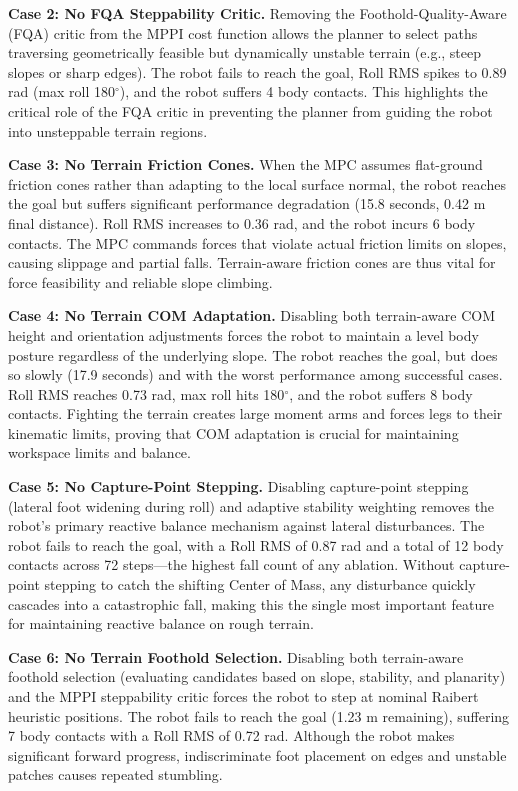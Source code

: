 \documentclass[letterpaper, 10 pt, conference]{ieeeconf}  %
\begin{document}
\textbf{Case 2: No FQA Steppability Critic.} Removing the Foothold-Quality-Aware (FQA) critic from the MPPI cost function allows the planner to select paths traversing geometrically feasible but dynamically unstable terrain (e.g., steep slopes or sharp edges). The robot fails to reach the goal, Roll RMS spikes to 0.89 rad (max roll 180$^\circ$), and the robot suffers 4 body contacts. This highlights the critical role of the FQA critic in preventing the planner from guiding the robot into unsteppable terrain regions.

\textbf{Case 3: No Terrain Friction Cones.} When the MPC assumes flat-ground friction cones rather than adapting to the local surface normal, the robot reaches the goal but suffers significant performance degradation (15.8 seconds, 0.42 m final distance). Roll RMS increases to 0.36 rad, and the robot incurs 6 body contacts. The MPC commands forces that violate actual friction limits on slopes, causing slippage and partial falls. Terrain-aware friction cones are thus vital for force feasibility and reliable slope climbing.

\textbf{Case 4: No Terrain COM Adaptation.} Disabling both terrain-aware COM height and orientation adjustments forces the robot to maintain a level body posture regardless of the underlying slope. The robot reaches the goal, but does so slowly (17.9 seconds) and with the worst performance among successful cases. Roll RMS reaches 0.73 rad, max roll hits 180$^\circ$, and the robot suffers 8 body contacts. Fighting the terrain creates large moment arms and forces legs to their kinematic limits, proving that COM adaptation is crucial for maintaining workspace limits and balance.

\textbf{Case 5: No Capture-Point Stepping.} Disabling capture-point stepping (lateral foot widening during roll) and adaptive stability weighting removes the robot's primary reactive balance mechanism against lateral disturbances. The robot fails to reach the goal, with a Roll RMS of 0.87 rad and a total of 12 body contacts across 72 steps—the highest fall count of any ablation. Without capture-point stepping to catch the shifting Center of Mass, any disturbance quickly cascades into a catastrophic fall, making this the single most important feature for maintaining reactive balance on rough terrain.

\textbf{Case 6: No Terrain Foothold Selection.} Disabling both terrain-aware foothold selection (evaluating candidates based on slope, stability, and planarity) and the MPPI steppability critic forces the robot to step at nominal Raibert heuristic positions. The robot fails to reach the goal (1.23 m remaining), suffering 7 body contacts with a Roll RMS of 0.72 rad. Although the robot makes significant forward progress, indiscriminate foot placement on edges and unstable patches causes repeated stumbling. 
\end{document}
